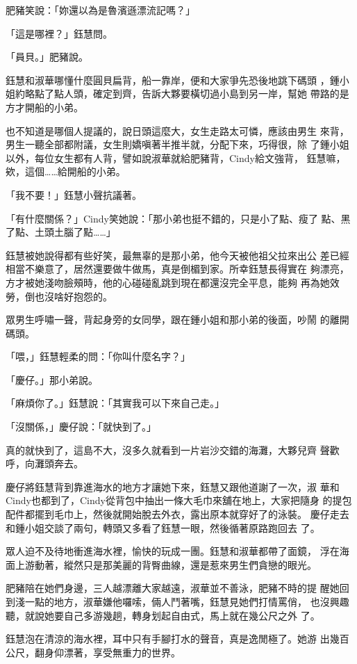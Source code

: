 肥豬笑說：「妳還以為是魯濱遜漂流記嗎？」

「這是哪裡？」鈺慧問。

「員貝。」肥豬說。

鈺慧和淑華哪懂什麼圓貝扁背，船一靠岸，便和大家爭先恐後地跳下碼頭
，鍾小姐約略點了點人頭，確定到齊，告訴大夥要橫切過小島到另一岸，幫她
帶路的是方才開船的小弟。

也不知道是哪個人提議的，說日頭這麼大，女生走路太可憐，應該由男生
來背，男生一聽全部都附議，女生則嬌嗔著半推半就，分配下來，巧得很，除
了鍾小姐以外，每位女生都有人背，譬如說淑華就給肥豬背，Cindy給文強背，
鈺慧嘛，欸，這個……給開船的小弟。

「我不要！」鈺慧小聲抗議著。

「有什麼關係？」Cindy笑她說：「那小弟也挺不錯的，只是小了點、瘦了
點、黑了點、土頭土腦了點……」

鈺慧被她說得都有些好笑，最無辜的是那小弟，他今天被他祖父拉來出公
差已經相當不樂意了，居然還要做牛做馬，真是倒楣到家。所幸鈺慧長得實在
夠漂亮，方才被她淺吻臉頰時，他的心碰碰亂跳到現在都還沒完全平息，能夠
再為她效勞，倒也沒啥好抱怨的。

眾男生呼嘯一聲，背起身旁的女同學，跟在鍾小姐和那小弟的後面，吵鬧
的離開碼頭。

「喂，」鈺慧輕柔的問：「你叫什麼名字？」

「慶仔。」那小弟說。

「麻煩你了。」鈺慧說：「其實我可以下來自己走。」

「沒關係，」慶仔說：「就快到了。」

真的就快到了，這島不大，沒多久就看到一片岩沙交錯的海灘，大夥兒齊
聲歡呼，向灘頭奔去。

慶仔將鈺慧背到靠進海水的地方才讓她下來，鈺慧又跟他道謝了一次，淑
華和Cindy也都到了，Cindy從背包中抽出一條大毛巾來舖在地上，大家把隨身
的提包配件都擺到毛巾上，然後就開始脫去外衣，露出原本就穿好了的泳裝。
慶仔走去和鍾小姐交談了兩句，轉頭又多看了鈺慧一眼，然後循著原路跑回去
了。

眾人迫不及待地衝進海水裡，愉快的玩成一團。鈺慧和淑華都帶了面鏡，
浮在海面上游動著，縱然只是那美麗的背臀曲線，還是惹來男生們貪戀的眼光。

肥豬陪在她們身邊，三人越漂離大家越遠，淑華並不善泳，肥豬不時的提
醒她回到淺一點的地方，淑華嫌他囉嗦，倆人鬥著嘴，鈺慧見她們打情罵俏，
也沒興趣聽，就說她要自己多游幾趟，轉身划起自由式，馬上就在幾公尺之外
了。

鈺慧泡在清涼的海水裡，耳中只有手腳打水的聲音，真是逸閒極了。她游
出幾百公尺，翻身仰漂著，享受無重力的世界。

